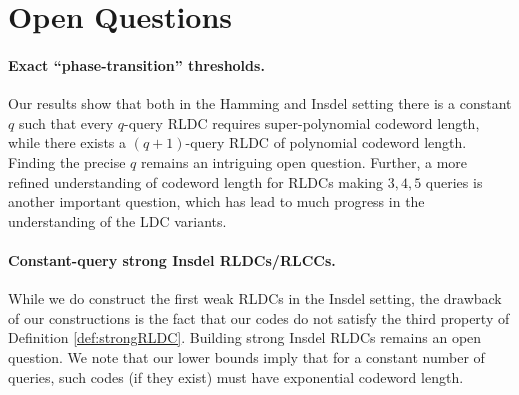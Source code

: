 \documentclass[10pt,a4paper]{article}
\theoremstyle{remark}
\newcommand{\eps}{\ensuremath{\varepsilon}}
\newcommand{\authnote}[3]{\textcolor{#2}{{\sf (#1's Note: {\sl{#3}})}}}
\newcommand{\minshen}{\authnote{Minshen}{purple}}
\newcommand{\xnote}{\authnote{Xin}{magenta}}
\newcommand{\enote}{\authnote{Elena}{green}}
\newcommand{\alex}[1]{\authnote{Alex}{orange}{#1}}
\newcommand{\authnote}{}
\newcommand{\minshen}[1]{}
\newcommand{\xnote}[1]{}
\newcommand{\enote}[1]{}
\newcommand{\alex}[1]{}
\begin{document}



\section{Open Questions}\label{sec:openproblems}

\paragraph{Exact ``phase-transition'' thresholds.} Our results show that both in the Hamming and Insdel setting there is a constant $q$ such that every $q$-query RLDC requires super-polynomial codeword length, while there exists a $(q+1)$-query RLDC of polynomial codeword length. 
Finding the precise $q$ remains an intriguing open question. Further, a more refined understanding of codeword length for RLDCs making $3, 4, 5$ queries is another important question, which has lead to much progress in the understanding of the LDC variants.


\paragraph{Constant-query strong Insdel RLDCs/RLCCs.} While we do construct the first weak RLDCs in the Insdel setting, the drawback of our constructions is the fact that our codes do not satisfy the third property of Definition \ref{def:strongRLDC}. Building strong Insdel RLDCs remains an open question. We note that our lower bounds imply that for a constant number of queries, such codes (if they exist) must have exponential codeword length.
\end{document}
